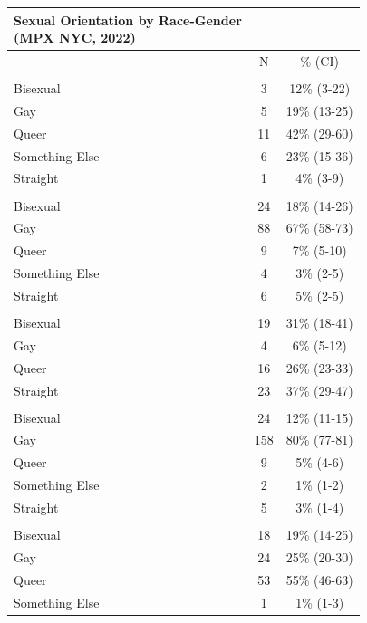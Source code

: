 \documentclass[
  letterpaper,
  DIV=11,
  numbers=noendperiod,
  oneside]{scrreprt}
\begin{document}
\begin{longtable*}{lcc}
\caption*{
{\large Sexual Orientation by Race-Gender} \\ 
{\small (MPX NYC, 2022)}
} \\ 
\toprule
 & N & \% (CI) \\ 
\midrule\addlinespace[2.5pt]
 \\ 
\midrule\addlinespace[2.5pt]
Bisexual & 3 & 12\% (3-22) \\ 
Gay & 5 & 19\% (13-25) \\ 
Queer & 11 & 42\% (29-60) \\ 
Something Else & 6 & 23\% (15-36) \\ 
Straight & 1 & 4\% (3-9) \\ 
\midrule\addlinespace[2.5pt]
 \\ 
\midrule\addlinespace[2.5pt]
Bisexual & 24 & 18\% (14-26) \\ 
Gay & 88 & 67\% (58-73) \\ 
Queer & 9 & 7\% (5-10) \\ 
Something Else & 4 & 3\% (2-5) \\ 
Straight & 6 & 5\% (2-5) \\ 
\midrule\addlinespace[2.5pt]
 \\ 
\midrule\addlinespace[2.5pt]
Bisexual & 19 & 31\% (18-41) \\ 
Gay & 4 & 6\% (5-12) \\ 
Queer & 16 & 26\% (23-33) \\ 
Straight & 23 & 37\% (29-47) \\ 
\midrule\addlinespace[2.5pt]
 \\ 
\midrule\addlinespace[2.5pt]
Bisexual & 24 & 12\% (11-15) \\ 
Gay & 158 & 80\% (77-81) \\ 
Queer & 9 & 5\% (4-6) \\ 
Something Else & 2 & 1\% (1-2) \\ 
Straight & 5 & 3\% (1-4) \\ 
\midrule\addlinespace[2.5pt]
 \\ 
\midrule\addlinespace[2.5pt]
Bisexual & 18 & 19\% (14-25) \\ 
Gay & 24 & 25\% (20-30) \\ 
Queer & 53 & 55\% (46-63) \\ 
Something Else & 1 & 1\% (1-3) \\ 

\end{longtable*}
\end{document}
